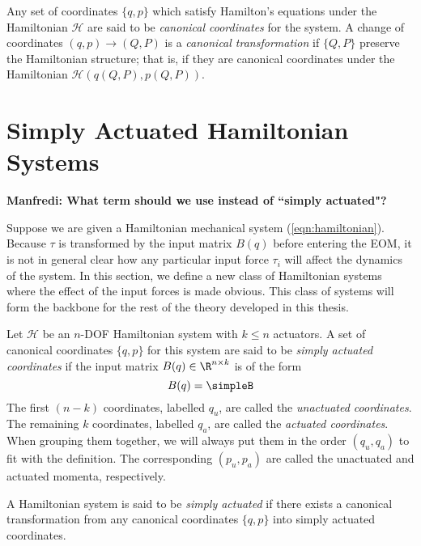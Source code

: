 Any set of coordinates \(\{q,p\}\) which satisfy Hamilton's equations 
under the Hamiltonian \(\mathcal{H}\) are
said to be \textit{canonical coordinates} for the system. A change of
coordinates \((q,p) \rightarrow (Q,P)\) is a \textit{canonical
transformation} if \(\{Q,P\}\) preserve the Hamiltonian structure; that is, if
they are canonical coordinates under the Hamiltonian
\(\mathcal{H}\left(q(Q,P), p(Q,P)\right)\).

\section{Simply Actuated Hamiltonian Systems}
\textbf{Manfredi: What term should we use instead of ``simply actuated"?}

Suppose we are given a Hamiltonian mechanical system (\ref{eqn:hamiltonian}).
Because \(\tau\) is transformed by the input matrix \(B(q)\) before
entering the EOM, it is not in general clear how any particular input force \(\tau_i\)
will affect the dynamics of the system. 
In this section, we define a new class of Hamiltonian systems where the effect
of the input forces is made obvious. This class of
systems will form the backbone for the rest of the theory developed in this
thesis.

\begin{defn}
    Let \(\mathcal{H}\) be an \(n\)-DOF Hamiltonian system 
    with \(k \leq n\) actuators. 
    A set of canonical coordinates \(\{q,p\}\) for this system
    are said to be \textit{simply actuated coordinates} if the
    input matrix \(B(q) \in \R^{n \times k}\) is of the form
    \[
        B(q) = \simpleB    
    \]
    The first \((n-k)\) coordinates, labelled \(q_u\), are called the
    \textit{unactuated coordinates}. The remaining \(k\) coordinates, labelled
    \(q_a\), are called the \textit{actuated coordinates}. When grouping them
    together, we will always put them in the order \((q_u, q_a)\) to fit with 
    the definition. 
    The corresponding \((p_u, p_a)\) are called the unactuated and actuated
    momenta, respectively.
\end{defn}
\begin{defn}
    A Hamiltonian system is said to be \textit{simply actuated} if there exists
    a canonical transformation from any canonical coordinates 
    \(\{q,p\}\) into simply actuated coordinates.
\end{defn}

